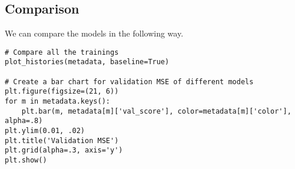 \subsection{Comparison}
We can compare the models in the following way.
\begin{lstlisting}[style=Python]
# Compare all the trainings
plot_histories(metadata, baseline=True)

# Create a bar chart for validation MSE of different models
plt.figure(figsize=(21, 6))
for m in metadata.keys():
    plt.bar(m, metadata[m]['val_score'], color=metadata[m]['color'], alpha=.8)
plt.ylim(0.01, .02)
plt.title('Validation MSE')
plt.grid(alpha=.3, axis='y')
plt.show()
\end{lstlisting}